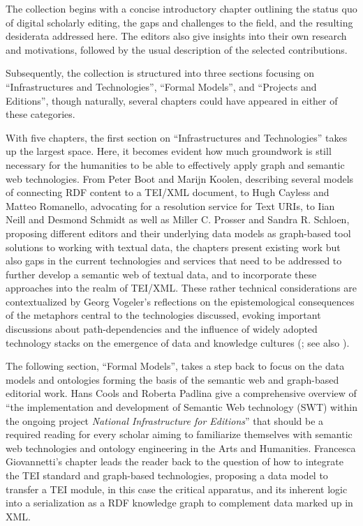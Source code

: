 \begin{review}
The collection begins with a concise introductory chapter outlining the
status quo of digital scholarly editing, the gaps and challenges to the
field, and the resulting desiderata addressed here. The editors also
give insights into their own research and motivations, followed by the
usual description of the selected contributions.

Subsequently, the collection is structured into three sections focusing
on ``Infrastructures and Technologies'', ``Formal Models'', and
``Projects and Editions'', though naturally, several chapters could have
appeared in either of these categories.

With five chapters, the first section on ``Infrastructures and
Technologies'' takes up the largest space. Here, it becomes evident how
much groundwork is still necessary for the humanities to be able to
effectively apply graph and semantic web technologies. From Peter Boot
and Marijn Koolen, describing several models of connecting RDF content
to a TEI/XML document, to Hugh Cayless and Matteo Romanello, advocating
for a resolution service for Text URIs, to Iian Neill and Desmond
Schmidt as well as Miller C. Prosser and Sandra R. Schloen, proposing
different editors and their underlying data models as graph-based tool
solutions to working with textual data, the chapters present existing
work but also gaps in the current technologies and services that need to
be addressed to further develop a semantic web of textual data, and to
incorporate these approaches into the realm of TEI/XML. These rather
technical considerations are contextualized by Georg Vogeler's
reflections on the epistemological consequences of the metaphors central
to the technologies discussed, evoking important discussions about
path-dependencies and the influence of widely adopted technology stacks
on the emergence of data and knowledge cultures 
(\cite{mahoney_historical_2006}; see also \cite{acker_data_2019}).

The following section, ``Formal Models'', takes a step back to focus on
the data models and ontologies forming the basis of the semantic web and
graph-based editorial work. Hans Cools and Roberta Padlina give a
comprehensive overview of ``the implementation and development of
Semantic Web technology (SWT) within the ongoing project \emph{National
Infrastructure for Editions}'' that should be a required reading for
every scholar aiming to familiarize themselves with semantic web
technologies and ontology engineering in the Arts and Humanities.
Francesca Giovannetti's chapter leads the reader back to the question of
how to integrate the TEI standard and graph-based technologies,
proposing a data model to transfer a TEI module, in this case the
critical apparatus, and its inherent logic into a serialization as a RDF
knowledge graph to complement data marked up in XML.


\end{review}
